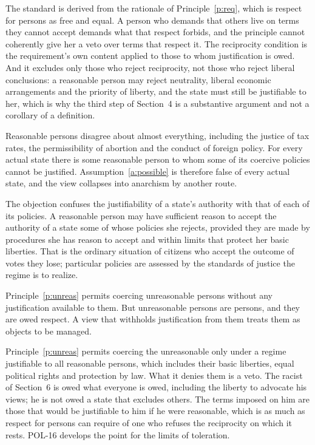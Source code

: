 \documentclass{situationist-preprint}
\begin{document}
\begin{reply}
The standard is derived from the rationale of Principle~\ref{p:req}, which is respect for persons as free and equal. A person who demands that others live on terms they cannot accept demands what that respect forbids, and the principle cannot coherently give her a veto over terms that respect it. The reciprocity condition is the requirement's own content applied to those to whom justification is owed. And it excludes only those who reject reciprocity, not those who reject liberal conclusions: a reasonable person may reject neutrality, liberal economic arrangements and the priority of liberty, and the state must still be justifiable to her, which is why the third step of Section~4 is a substantive argument and not a corollary of a definition.
\end{reply}

\begin{objection}[Emptiness]
Reasonable persons disagree about almost everything, including the justice of tax rates, the permissibility of abortion and the conduct of foreign policy. For every actual state there is some reasonable person to whom some of its coercive policies cannot be justified. Assumption~\ref{a:possible} is therefore false of every actual state, and the view collapses into anarchism by another route.
\end{objection}

\begin{reply}
The objection confuses the justifiability of a state's authority with that of each of its policies. A reasonable person may have sufficient reason to accept the authority of a state some of whose policies she rejects, provided they are made by procedures she has reason to accept and within limits that protect her basic liberties. That is the ordinary situation of citizens who accept the outcome of votes they lose; particular policies are assessed by the standards of justice the regime is to realize.
\end{reply}

\begin{objection}
Principle~\ref{p:unreas} permits coercing unreasonable persons without any justification available to them. But unreasonable persons are persons, and they are owed respect. A view that withholds justification from them treats them as objects to be managed.
\end{objection}

\begin{reply}
Principle~\ref{p:unreas} permits coercing the unreasonable only under a regime justifiable to all reasonable persons, which includes their basic liberties, equal political rights and protection by law. What it denies them is a veto. The racist of Section~6 is owed what everyone is owed, including the liberty to advocate his views; he is not owed a state that excludes others. The terms imposed on him are those that would be justifiable to him if he were reasonable, which is as much as respect for persons can require of one who refuses the reciprocity on which it rests. POL-16 develops the point for the limits of toleration.
\end{reply}
\end{document}
